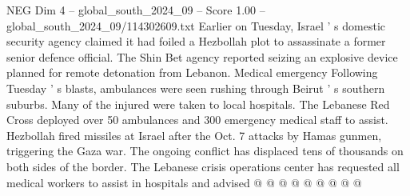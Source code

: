 \begin{textsample}{NEG Dim 4 – global\_south\_2024\_09 – Score 1.00 – global\_south\_2024\_09/114302609.txt}
Earlier on Tuesday, Israel ' s domestic security agency claimed it had foiled a Hezbollah plot to assassinate a former senior defence official.
The Shin Bet agency reported seizing an explosive device planned for remote detonation from Lebanon.
Medical emergency Following Tuesday ' s blasts, ambulances were seen rushing through Beirut ' s southern suburbs.
Many of the injured were taken to local hospitals.
The Lebanese Red Cross deployed over 50 ambulances and 300 emergency medical staff to assist.
Hezbollah fired missiles at Israel after the Oct. 7 attacks by Hamas gunmen, triggering the Gaza war.
The ongoing conflict has displaced tens of thousands on both sides of the border.
The Lebanese crisis operations center has requested all medical workers to assist in hospitals and advised @ @ @ @ @ @ @ @ @

\end{textsample}
